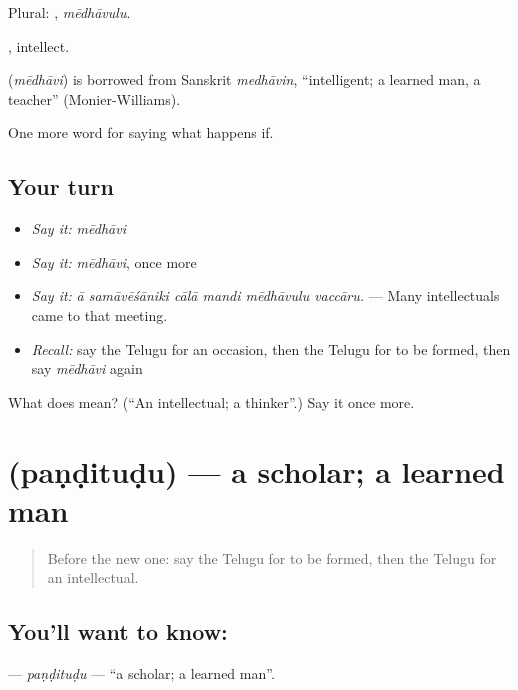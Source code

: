 Plural: , \emph{mēdhāvulu}.

, intellect.

\begin{cousinweb}
\textbf{} (\emph{mēdhāvi}) is borrowed from Sanskrit \emph{medhāvin}, \textquotedblleft{}intelligent; a learned man, a teacher\textquotedblright{} (Monier-Williams).
\end{cousinweb}

\begin{grammarlens}[title={What you've built}]
One more word for saying what happens if.
\end{grammarlens}

\subsection*{Your turn}
\begin{itemize}
\raggedright
  \item \emph{Say it:} \emph{mēdhāvi}
  \item \emph{Say it:} \emph{mēdhāvi}, once more
  \item \emph{Say it:} \emph{ā samāvēśāniki cālā mandi mēdhāvulu vaccāru.} — Many intellectuals came to that meeting.
  \item \emph{Recall:} say the Telugu for an occasion, then the Telugu for to be formed, then say \emph{mēdhāvi} again
\end{itemize}

\begin{tcolorbox}[breakable,colback=teal!4,colframe=teal!35!black,title={Before you move on}]
What does  mean? (\textquotedblleft{}An intellectual; a thinker\textquotedblright{}.) Say it once more.
\end{tcolorbox}
\section[\texorpdfstring{\te{పండితుడు} (paṇḍituḍu)}{పండితుడు (paṇḍituḍu)}]{ (paṇḍituḍu) — a scholar; a learned man}

\label{lesson:TE-C435-panditudu}



\begin{quote}
Before the new one: say the Telugu for to be formed, then the Telugu for an intellectual.
\end{quote}

\subsection*{You'll want to know: }
\textbf{} — \emph{paṇḍituḍu} — \textquotedblleft{}a scholar; a learned man\textquotedblright{}.

